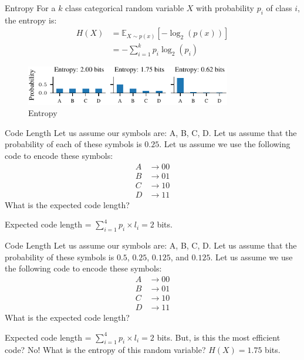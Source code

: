 \documentclass[handout]{beamer}
\begin{document}
\begin{frame}{Entropy}
    For a $k$ class categorical random variable $X$ with probability $p_i$ of class $i$, the entropy is:
    \begin{align*}
        H(X) &= \mathbb{E}_{X \sim p(x)}[-\log_2(p(x))] \\
        &= -\sum_{i=1}^k p_i \log_2(p_i)
    \end{align*}

    \begin{figure}
        \centering
        \includegraphics[width=0.8\textwidth]{notebooks/figures/information-theory/categorical-entropy.pdf}
        \caption{Entropy}
        \label{fig:entropy_categorical}
    \end{figure}
    
\end{frame}

\begin{frame}{Code Length}
Let us assume our symbols are: A, B, C, D. Let us assume that the probability of each of these symbols is $0.25$. 
Let us assume we use the following code to encode these symbols:
\begin{align*}
    A &\rightarrow 00 \\
    B &\rightarrow 01 \\
    C &\rightarrow 10 \\
    D &\rightarrow 11
\end{align*}
What is the expected code length?

Expected code length = $\sum_{i=1}^4 p_i \times l_i = 2$ bits.
    
\end{frame}

\begin{frame}{Code Length}
    Let us assume our symbols are: A, B, C, D. Let us assume that the probability of these symbols is $0.5$, $0.25$, $0.125$, and $0.125$. 
    Let us assume we use the following code to encode these symbols:
    \begin{align*}
        A &\rightarrow 00 \\
        B &\rightarrow 01 \\
        C &\rightarrow 10 \\
        D &\rightarrow 11
    \end{align*}
    What is the expected code length?
    
    Expected code length = $\sum_{i=1}^4 p_i \times l_i = 2$ bits.
    But, is this the most efficient code?
    \pause No! What is the entropy of this random variable?
    \pause $H(X) = 1.75$ bits.
        
    \end{frame}
\end{document}
